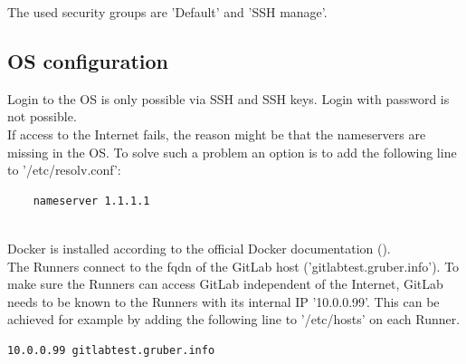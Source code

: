 The used security groups are 'Default' and 'SSH manage'.

\subsection{OS configuration}

Login to the OS is only possible via SSH and SSH keys. Login with password is not possible.\\

If access to the Internet fails, the reason might be that the nameservers are missing in the OS.
To solve such a problem an option is to add the following line to '/etc/resolv.conf':
\begin{lstlisting}
	nameserver 1.1.1.1
\end{lstlisting}
\  \\
Docker is installed according to the official Docker documentation (\cite{refDockerDebian}).\\

The Runners connect to the \ac{fqdn} of the GitLab host ('gitlabtest.gruber.info').
To make sure the Runners can access GitLab independent of the Internet, GitLab needs to be known to the Runners with its internal IP '10.0.0.99'.
This can be achieved for example by adding the following line to '/etc/hosts' on each Runner.
\begin{lstlisting}
10.0.0.99 gitlabtest.gruber.info
\end{lstlisting}
